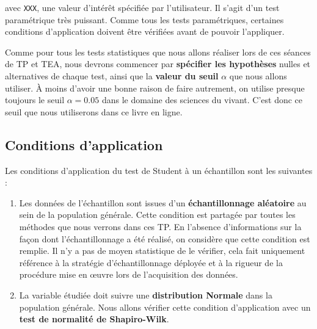 \documentclass[
  a4paper,
  DIV=11,
  numbers=noendperiod,
  oneside]{scrreprt}
\providecommand{\tightlist}{%
  \setlength{\itemsep}{0pt}\setlength{\parskip}{0pt}}\usepackage{longtable,booktabs,array}
\begin{document}
avec \texttt{XXX}, une valeur d'intérêt spécifiée par l'utilisateur. Il
s'agit d'un test paramétrique très puissant. Comme tous les tests
paramétriques, certaines conditions d'application doivent être vérifiées
avant de pouvoir l'appliquer.

\begin{tcolorbox}[enhanced jigsaw, breakable, toprule=.15mm, colbacktitle=quarto-callout-important-color!10!white, colframe=quarto-callout-important-color-frame, arc=.35mm, bottomtitle=1mm, opacityback=0, title=\textcolor{quarto-callout-important-color}{\faExclamation}\hspace{0.5em}{Important}, bottomrule=.15mm, colback=white, toptitle=1mm, rightrule=.15mm, leftrule=.75mm, opacitybacktitle=0.6, left=2mm, titlerule=0mm, coltitle=black]

Comme pour tous les tests statistiques que nous allons réaliser lors de
ces séances de TP et TEA, nous devrons commencer par \textbf{spécifier
les hypothèses} nulles et alternatives de chaque test, ainsi que la
\textbf{valeur du seuil} \(\alpha\) que nous allons utiliser. À moins
d'avoir une bonne raison de faire autrement, on utilise presque toujours
le seuil \(\alpha = 0.05\) dans le domaine des sciences du vivant. C'est
donc ce seuil que nous utiliserons dans ce livre en ligne.

\end{tcolorbox}

\hypertarget{sec-norm}{%
\subsection{Conditions d'application}\label{sec-norm}}

Les conditions d'application du test de Student à un échantillon sont
les suivantes :

\begin{enumerate}
\def\labelenumi{\arabic{enumi}.}
\tightlist
\item
  Les données de l'échantillon sont issues d'un \textbf{échantillonnage
  aléatoire} au sein de la population générale. Cette condition est
  partagée par toutes les méthodes que nous verrons dans ces TP. En
  l'absence d'informations sur la façon dont l'échantillonnage a été
  réalisé, on considère que cette condition est remplie. Il n'y a pas de
  moyen statistique de le vérifier, cela fait uniquement référence à la
  stratégie d'échantillonnage déployée et à la rigueur de la procédure
  mise en œuvre lors de l'acquisition des données.
\item
  La variable étudiée doit suivre une \textbf{distribution Normale} dans
  la population générale. Nous allons vérifier cette condition
  d'application avec un \textbf{test de normalité de Shapiro-Wilk}.
\end{enumerate}
\end{document}
